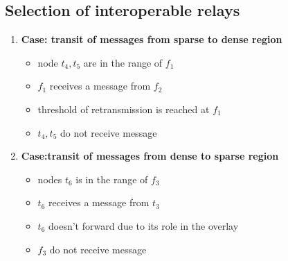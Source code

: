 
\subsection{Selection of interoperable relays}
\label{sec:mechanisms:interop-relays-selection}
	\begin{enumerate}
		\item \textbf{Case: transit of messages from sparse to dense region}
		\begin{itemize}
			\item node $t_{4}, t_{5}$ are in the range of $f_{1}$
			\item $f_{1}$ receives a message from $f_{2}$
			\item threshold of retransmission is reached at $f_{1}$
			\item $t_{4}, t_{5}$ do not receive message
		\end{itemize}
		
		\item \textbf{Case:transit of messages from dense to sparse region}
		\begin{itemize}
			\item nodes $t_{6}$ is in the range of $f_{3}$
			\item $t_{6}$ receives a message from $t_{3}$
			\item $t_{6}$ doesn't forward due to its role in the overlay
			\item $f_{3}$ do not receive message
		\end{itemize}
	\end{enumerate}

